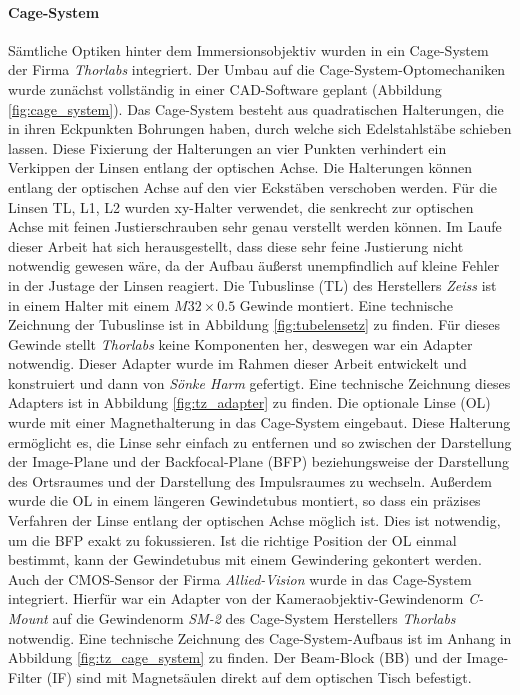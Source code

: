 \documentclass[titlepage,  ngerman]{article}
\begin{document}
	\paragraph{Cage-System}
	Sämtliche Optiken hinter dem Immersionsobjektiv wurden in ein Cage-System der Firma \textit{Thorlabs} integriert. Der Umbau auf die Cage-System-Optomechaniken wurde zunächst vollständig in einer CAD-Software geplant (Abbildung \ref{fig:cage_system}). Das Cage-System besteht aus quadratischen Halterungen, die in ihren Eckpunkten Bohrungen haben, durch welche sich Edelstahlstäbe schieben lassen. Diese Fixierung der Halterungen an vier Punkten verhindert ein Verkippen der Linsen entlang der optischen Achse. Die Halterungen können entlang der optischen Achse auf den vier Eckstäben verschoben werden. Für die  Linsen TL, L1, L2 wurden xy-Halter verwendet, die senkrecht zur optischen Achse mit feinen Justierschrauben sehr genau verstellt werden können. Im Laufe dieser Arbeit hat sich herausgestellt, dass diese sehr feine Justierung nicht notwendig gewesen wäre, da der Aufbau äußerst unempfindlich auf kleine Fehler in der Justage der Linsen reagiert. Die Tubuslinse (TL) des Herstellers \textit{Zeiss} ist in einem Halter mit einem $M32\times0.5$ Gewinde montiert. Eine technische Zeichnung der Tubuslinse ist in Abbildung \ref{fig:tubelensetz} zu finden. Für dieses Gewinde stellt \textit{Thorlabs} keine Komponenten her, deswegen war ein Adapter notwendig. Dieser Adapter wurde im Rahmen dieser Arbeit entwickelt und konstruiert und dann von \textit{Sönke Harm} gefertigt. Eine technische Zeichnung dieses Adapters ist in Abbildung \ref{fig:tz_adapter} zu finden. Die optionale Linse (OL) wurde mit einer Magnethalterung in das Cage-System eingebaut. Diese Halterung ermöglicht es, die Linse sehr einfach zu entfernen und so zwischen der Darstellung der Image-Plane und der Backfocal-Plane (BFP) beziehungsweise der Darstellung des Ortsraumes und der Darstellung des Impulsraumes zu wechseln. Außerdem wurde die OL in einem längeren Gewindetubus montiert, so dass ein präzises Verfahren der Linse entlang der optischen Achse möglich ist. Dies ist notwendig, um die BFP exakt zu fokussieren. Ist die richtige Position der OL einmal bestimmt, kann der Gewindetubus mit einem Gewindering gekontert werden. Auch der CMOS-Sensor der Firma \textit{Allied-Vision} wurde in das Cage-System integriert. Hierfür war ein Adapter von der Kameraobjektiv-Gewindenorm \textit{C-Mount} auf die Gewindenorm \textit{SM-2} des Cage-System Herstellers \textit{Thorlabs} notwendig. Eine technische Zeichnung des Cage-System-Aufbaus ist im Anhang in Abbildung \ref{fig:tz_cage_system} zu finden. Der Beam-Block (BB) und der Image-Filter (IF) sind mit Magnetsäulen direkt auf dem optischen Tisch befestigt.
\end{document}
